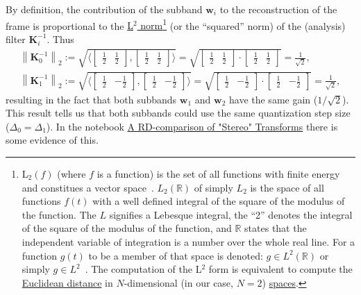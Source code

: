 By definition, the contribution of the subband ${\mathbf w}_i$ to the reconstruction of the frame  is
proportional to the
\href{https://en.wikipedia.org/wiki/Lp_space}{L$^2$
  norm}\footnote{L$_2(f)$ (where $f$ is a function) is the set of all
  functions with finite energy and constitues a vector
  space~\cite{sayood2017introduction}. $L_2({\mathbb R})$ of simply
  $L_2$ is the space of all functions $f(t)$ with a well defined
  integral of the square of the modulus of the function. The $L$
  signifies a Lebesque integral, the ``2'' denotes the integral of the
  square of the modulus of the function, and ${\mathbb R}$ states that
  the independent variable of integration is a number over the whole
  real line. For a function $g(t)$ to be a member of that space is
  denoted: $g\in L^2({\mathbb R})$ or simply
  $g\in L^2$~\cite{burrus2013wavelets}. The computation of the L$^2$
  form is equivalent to compute the
  \href{https://en.wikipedia.org/wiki/Euclidean_distance}{Euclidean
    distance} in $N$-dimensional (in our case, $N=2$)
  \href{https://en.wikipedia.org/wiki/Vector_space}{spaces}.} (or the
``squared'' norm) of the (analysis) filter ${\mathbf K}_i^{-1}$. Thus
\begin{equation}
  \begin{array}{l}
    \left\| {\mathbf K}_0^{-1} \right\|_2 := \sqrt{\langle \begin{bmatrix} \frac{1}{2} & \frac{1}{2} \end{bmatrix}, \begin{bmatrix} \frac{1}{2} & \frac{1}{2} \end{bmatrix} \rangle} = \sqrt{\begin{bmatrix}\frac{1}{2} & \frac{1}{2} \end{bmatrix} \cdot \begin{bmatrix} \frac{1}{2} & \frac{1}{2} \end{bmatrix}} = \frac{1}{\sqrt{2}},\\
    \left\| {\mathbf K}_1^{-1} \right\|_2 := \sqrt{\langle \begin{bmatrix} \frac{1}{2} & -\frac{1}{2} \end{bmatrix}, \begin{bmatrix} \frac{1}{2} & -\frac{1}{2} \end{bmatrix} \rangle} = \sqrt{\begin{bmatrix} \frac{1}{2} & -\frac{1}{2} \end{bmatrix}\cdot \begin{bmatrix} \frac{1}{2} & -\frac{1}{2} \end{bmatrix}} = \frac{1}{\sqrt{2}},
  \end{array}
\end{equation}
resulting in the fact that both subbands ${\mathbf w}_1$ and ${\mathbf w}_2$ have
the same gain ($1/\sqrt{2}$). This result tells us that both subbands
could use the same quantization step size ($\Delta_0=\Delta_1$). In
the notebook
\href{https://github.com/Tecnologias-multimedia/Tecnologias-multimedia.github.io/blob/master/contents/transform_coding/stereo_transforms_RD.ipynb}{A
  RD-comparison of "Stereo" Transforms} there is some evidence of
this.

